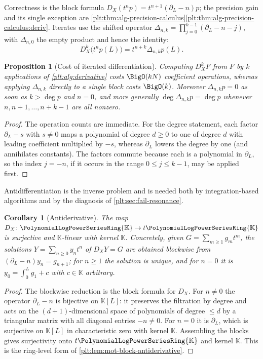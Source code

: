 \documentclass[11pt,oneside]{article}
\theoremstyle{plain}
\newtheorem{proposition}[theorem]{Proposition}
\newtheorem{corollary}[theorem]{Corollary}
\theoremstyle{definition}
\theoremstyle{remark}
\newcommand{\K}{\mathbb{K}}
\newcommand{\PLpow}{\PolynomialLogPowerSeriesRing{\K}}   %
\newcommand{\DX}{D_{X}}                                  %
\newcommand{\shiftop}[2]{\Delta_{#1,#2}}                 %
\begin{document}
Correctness is the block formula \(\DX(t^np)=t^{n+1}(\partial_L-n)p\); the
precision gain and its single exception are
\cref{plt:thm:alg-precision-calculus}\ref{plt:thm:alg-precision-calculus:deriv}.
Iterates use the shifted operator \(\shiftop{n}{k}=\prod_{j=0}^{k-1}(\partial_L-n-j)\),
with \(\shiftop{n}{0}\) the empty product and hence the identity:
\[
 \DX^k\bigl(t^np(L)\bigr)=t^{n+k}\shiftop{n}{k}p(L).
\]

\begin{proposition}[Cost of iterated differentiation]
\label{plt:prop:alg-iterated-derivative}
Computing \(\DX^k F\) from \(F\) by \(k\) applications of
\cref{plt:alg:derivative} costs \(\BigO(kN)\) coefficient operations, whereas
applying \(\shiftop{n}{k}\) directly to a \emph{single} block costs
\(\BigO(k)\).  Moreover \(\shiftop{n}{k}p=0\) as soon as
\(k>\deg p\) and \(n=0\), and more generally
\(\deg\shiftop{n}{k}p=\deg p\) whenever \(n,n+1,\dots,n+k-1\) are all nonzero.
\end{proposition}

\begin{proof}
The operation counts are immediate.  For the degree statement, each factor
\(\partial_L-s\) with \(s\ne0\) maps a polynomial of degree \(d\ge0\) to one of
degree \(d\) with leading coefficient multiplied by \(-s\), whereas
\(\partial_L\) lowers the degree by one (and annihilates constants).  The
factors commute because each is a polynomial in \(\partial_L\), so the index
\(j=-n\), if it occurs in the range \(0\le j\le k-1\), may be applied first.
\end{proof}

Antidifferentiation is the inverse problem and is needed both by
integration-based algorithms and by the diagnosis of
\cref{plt:sec:fail-resonance}.

\begin{corollary}[Antiderivative]\label{plt:cor:alg-antiderivative}
The map \(\DX\colon\PLpow\to t\PLpow\) is surjective and \(\K\)-linear with
kernel \(\K\).  Concretely, given \(G=\sum_{m\ge1}g_mt^m\), the solutions
\(Y=\sum_{n\ge0}y_nt^n\) of \(\DX Y=G\) are obtained blockwise from
\((\partial_L-n)y_n=g_{n+1}\); for \(n\ge1\) the solution is unique, and for
\(n=0\) it is \(y_0=\int_0^Lg_1+c\) with \(c\in\K\) arbitrary.
\end{corollary}

\begin{proof}
The blockwise reduction is the block formula for \(\DX\).  For \(n\ne0\) the
operator \(\partial_L-n\) is bijective on \(\K[L]\): it preserves the filtration
by degree and acts on the \((d+1)\)-dimensional space of polynomials of degree
\(\le d\) by a triangular matrix with all diagonal entries \(-n\ne0\).  For
\(n=0\) it is \(\partial_L\), which is surjective on \(\K[L]\) in characteristic
zero with kernel \(\K\).  Assembling the blocks gives surjectivity onto
\(t\PLpow\) and kernel \(\K\).  This is the ring-level form of
\cref{plt:lem:mot-block-antiderivative}.
\end{proof}
\end{document}
